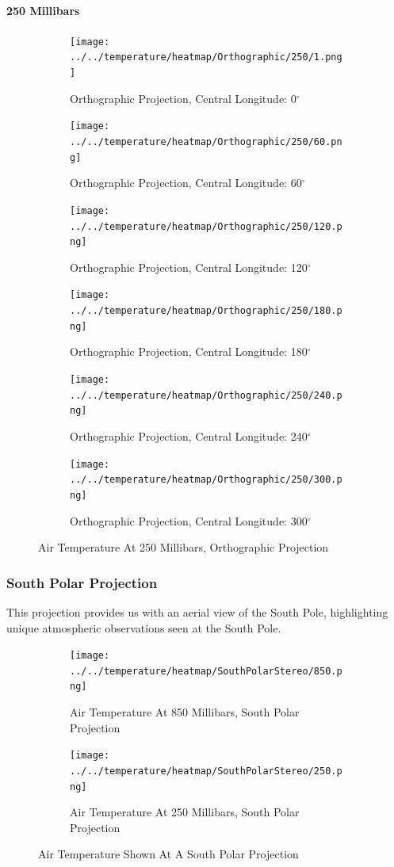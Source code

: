 \documentclass[hidelinks]{article}
\begin{document}
\paragraph{250 Millibars}
\begin{figure}[h!]
	\begin{subfigure}[b]{0.45545\linewidth}
		\centering
		\texttt{[image: ../../temperature/heatmap/Orthographic/250/1.png]}
		\caption{Orthographic Projection, Central Longitude: 0$^\circ$}
	\end{subfigure}
	\begin{subfigure}[b]{0.45545\linewidth}
		\centering
		\texttt{[image: ../../temperature/heatmap/Orthographic/250/60.png]}
		\caption{Orthographic Projection, Central Longitude: 60$^\circ$}
	\end{subfigure}
	\begin{subfigure}[b]{0.45545\linewidth}
		\centering
		\texttt{[image: ../../temperature/heatmap/Orthographic/250/120.png]}
		\caption{Orthographic Projection, Central Longitude: 120$^\circ$}
	\end{subfigure}
	\begin{subfigure}[b]{0.45545\linewidth}
		\centering
		\texttt{[image: ../../temperature/heatmap/Orthographic/250/180.png]}
		\caption{Orthographic Projection, Central Longitude: 180$^\circ$}
	\end{subfigure}
	\begin{subfigure}[b]{0.45545\linewidth}
		\centering
		\texttt{[image: ../../temperature/heatmap/Orthographic/250/240.png]}
		\caption{Orthographic Projection, Central Longitude: 240$^\circ$}
	\end{subfigure}
	\begin{subfigure}[b]{0.45545\linewidth}
		\centering
		\texttt{[image: ../../temperature/heatmap/Orthographic/250/300.png]}
		\caption{Orthographic Projection, Central Longitude: 300$^\circ$}
	\end{subfigure}
	\caption{Air Temperature At 250 Millibars, Orthographic Projection}
\end{figure}
\newpage
\subsubsection{South Polar Projection}
This projection provides us with an aerial view of the South Pole, highlighting unique atmospheric observations seen at the South Pole.
\begin{figure}[h!]
	\begin{subfigure}[b]{\linewidth}
		\centering
		\texttt{[image: ../../temperature/heatmap/SouthPolarStereo/850.png]}
		\caption{Air Temperature At 850 Millibars, South Polar Projection}
	\end{subfigure}
	\begin{subfigure}[b]{\linewidth}
		\centering
		\texttt{[image: ../../temperature/heatmap/SouthPolarStereo/250.png]}
		\caption{Air Temperature At 250 Millibars, South Polar Projection}
	\end{subfigure}
	\caption{Air Temperature Shown At A South Polar Projection}
\end{figure}
\end{document}
